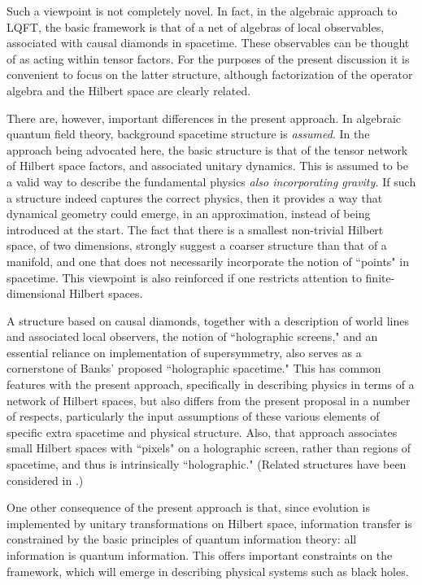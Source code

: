 Such a viewpoint is not completely novel.  In fact, in the algebraic approach to LQFT, the basic framework is that of a net of algebras of local observables, associated with causal diamonds in spacetime.  These observables can be thought of as acting within tensor factors.  For the purposes of the present discussion it is convenient to focus on the latter structure, although factorization of the operator algebra and the Hilbert space are clearly related.

There are, however, important differences in the present approach.
 In algebraic quantum field theory, background spacetime structure is {\it assumed}.  In the approach being advocated here, the basic structure is that of the tensor network of Hilbert space factors, and associated unitary dynamics.  This is assumed to be a valid way to describe the fundamental physics {\it also incorporating gravity.}  If such a structure indeed captures the correct physics, then it provides a way that dynamical geometry could emerge, in an approximation, instead of being introduced at the start. 
The fact that there is a smallest non-trivial Hilbert space, of two dimensions, strongly suggest a coarser structure than that of a manifold, and one that does not necessarily incorporate the notion of 	``points" in spacetime.  This viewpoint is also reinforced if one restricts attention to finite-dimensional Hilbert spaces.


A structure based on causal diamonds, together with a description of world lines and associated local observers, the notion of ``holographic screens," and an essential reliance on implementation of supersymmetry, also serves as a cornerstone of Banks' proposed ``holographic spacetime."  This has common features with the present approach, specifically in describing physics in terms of a network of Hilbert spaces, but also differs from the present proposal in a number of respects, particularly the input assumptions of these various elements of specific extra spacetime and physical structure.  Also, that approach associates small Hilbert spaces with ``pixels" on a holographic screen, rather than regions of spacetime, and thus is intrinsically ``holographic." (Related structures have been considered in .)

One other consequence of the present approach is that, since evolution is implemented by unitary transformations on Hilbert space, information transfer is constrained by the basic principles of quantum information theory:  all information is quantum information.  This offers important constraints on the framework, which will emerge in describing physical systems such as black holes.


